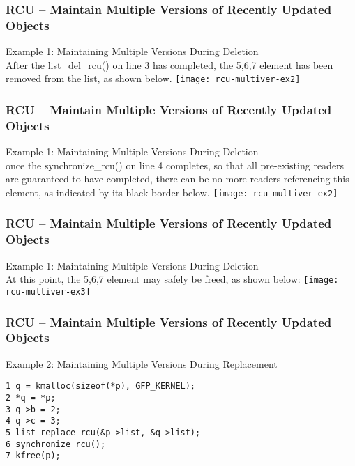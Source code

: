 \begin{frame}[fragile]
    \frametitle{RCU -- Maintain Multiple Versions of Recently Updated Objects}
    \Large
    Example 1: Maintaining Multiple Versions During Deletion \\
    
    After the list\_del\_rcu() on line 3 has completed, the 5,6,7 element has been removed from the list, as shown below. 
    \texttt{[image: rcu-multiver-ex2]}
\end{frame}

\begin{frame}[fragile]
    \frametitle{RCU -- Maintain Multiple Versions of Recently Updated Objects}
    \Large
    Example 1: Maintaining Multiple Versions During Deletion \\
    
    once the synchronize\_rcu() on line 4 completes, so that all pre-existing readers are guaranteed to have completed, there can be no more readers referencing this element, as indicated by its black border below.
    \texttt{[image: rcu-multiver-ex2]}
\end{frame}

\begin{frame}[fragile]
    \frametitle{RCU -- Maintain Multiple Versions of Recently Updated Objects}
    \Large
    Example 1: Maintaining Multiple Versions During Deletion \\
    
    At this point, the 5,6,7 element may safely be freed, as shown below: 
    \texttt{[image: rcu-multiver-ex3]}
\end{frame}


\begin{frame}[fragile]
    \frametitle{RCU -- Maintain Multiple Versions of Recently Updated Objects}
    \Large
    Example 2: Maintaining Multiple Versions During Replacement
    \begin{block}{}
        \begin{verbatim}
1 q = kmalloc(sizeof(*p), GFP_KERNEL);
2 *q = *p;
3 q->b = 2;
4 q->c = 3;
5 list_replace_rcu(&p->list, &q->list);
6 synchronize_rcu();
7 kfree(p);
        \end{verbatim}
    \end{block} 
\end{frame}

